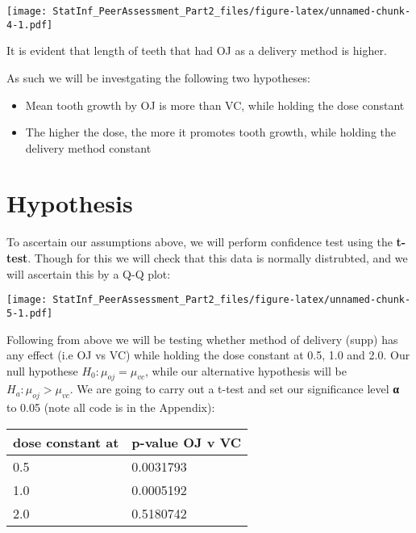 \documentclass[]{article}
\newenvironment{Shaded}{\begin{snugshade}}{\end{snugshade}}
\newcommand{\KeywordTok}[1]{\textcolor[rgb]{0.13,0.29,0.53}{\textbf{#1}}}
\newcommand{\DataTypeTok}[1]{\textcolor[rgb]{0.13,0.29,0.53}{#1}}
\newcommand{\StringTok}[1]{\textcolor[rgb]{0.31,0.60,0.02}{#1}}
\newcommand{\OperatorTok}[1]{\textcolor[rgb]{0.81,0.36,0.00}{\textbf{#1}}}
\newcommand{\NormalTok}[1]{#1}
\providecommand{\tightlist}{%
  \setlength{\itemsep}{0pt}\setlength{\parskip}{0pt}}
\begin{document}
\texttt{[image: StatInf\_PeerAssessment\_Part2\_files/figure-latex/unnamed-chunk-4-1.pdf]}

It is evident that length of teeth that had OJ as a delivery method is
higher.

As such we will be investgating the following two hypotheses:

\begin{itemize}
\tightlist
\item
  Mean tooth growth by OJ is more than VC, while holding the dose
  constant
\item
  The higher the dose, the more it promotes tooth growth, while holding
  the delivery method constant
\end{itemize}

\section{Hypothesis}\label{hypothesis}

To ascertain our assumptions above, we will perform confidence test
using the \textbf{t-test}. Though for this we will check that this data
is normally distrubted, and we will ascertain this by a Q-Q plot:

\begin{Shaded}
\end{Shaded}

\texttt{[image: StatInf\_PeerAssessment\_Part2\_files/figure-latex/unnamed-chunk-5-1.pdf]}

Following from above we will be testing whether method of delivery
(supp) has any effect (i.e OJ vs VC) while holding the dose constant at
0.5, 1.0 and 2.0. Our null hypothese \textbf{\(H_0:μ_{oj} = μ_{vc}\)},
while our alternative hypothesis will be
\textbf{\(H_a:μ_{oj} > μ_{vc}\)}. We are going to carry out a t-test and
set our significance level \textbf{α} to 0.05 (note all code is in the
Appendix):

\begin{longtable}[]{@{}ll@{}}
\toprule
dose constant at & p-value OJ v VC\tabularnewline
\midrule
\endhead
0.5 & 0.0031793\tabularnewline
1.0 & 0.0005192\tabularnewline
2.0 & 0.5180742\tabularnewline
\bottomrule
\end{longtable}
\end{document}
